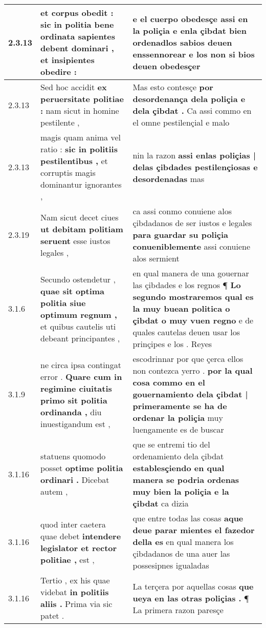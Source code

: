 \begin{tabular}{|p{1cm}|p{6.5cm}|p{6.5cm}|}
2.3.13 & et corpus obedit : \textbf{ sic in politia bene ordinata sapientes debent dominari , } et insipientes obedire : & e el cuerpo obedesçe assi en la poliçia \textbf{ e enla çibdat bien ordenadlos sabios deuen enssennorear } e los non si bios deuen obedesçer \\\hline
2.3.13 & Sed hoc accidit \textbf{ ex peruersitate politiae : } nam sicut in homine pestilente , & Mas esto contesçe \textbf{ por desordenança dela poliçia e dela çibdat . } Ca assi commo en el omne pestilençial e malo \\\hline
2.3.13 & magis quam anima vel ratio : \textbf{ sic in politiis pestilentibus , } et corruptis magis dominantur ignorantes , & nin la razon \textbf{ assi enlas poliçias | delas çibdades pestilençiosas e desordenadas } mas \\\hline
2.3.19 & Nam sicut decet ciues \textbf{ ut debitam politiam seruent } esse iustos legales , & ca assi conmo conuiene alos çibdadanos de ser iustos e legales \textbf{ para guardar su poliçia conueniblemente } assi conuiene alos sermient \\\hline
3.1.6 & Secundo ostendetur , \textbf{ quae sit optima politia siue optimum regnum , } et quibus cautelis uti debeant principantes , & en qual manera de una gouernar las çibdades e los regnos ¶ \textbf{ Lo segundo mostraremos qual es la muy buean politica o çibdat o muy vuen regno } e de quales cautelas deuen usar los prinçipes e los . Reyes \\\hline
3.1.9 & ne circa ipsa contingat error . \textbf{ Quare cum in regimine ciuitatis primo sit politia ordinanda , } diu inuestigandum est , & escodrinnar por que çerca ellos non contezca yerro . \textbf{ por la qual cosa commo en el gouernamiento dela çibdat | primeramente se ha de ordenar la poliçia } muy luengamente es de buscar \\\hline
3.1.16 & statuens quomodo posset \textbf{ optime politia ordinari . } Dicebat autem , & que se entremi tio del ordenamiento dela çibdat \textbf{ establesçiendo en qual manera se podria ordenas muy bien la poliçia e la çibdat } ca dizia \\\hline
3.1.16 & quod inter caetera quae debet \textbf{ intendere legislator et rector politiae , } est , & que entre todas las cosas \textbf{ aque deue parar mientes el fazedor della es } en qual manera los çibdadanos de una auer las possesipnes igualadas \\\hline
3.1.16 & Tertio , ex his quae videbat \textbf{ in politiis aliis . } Prima via sic patet . & La terçera por aquellas cosas \textbf{ que ueya en las otras poliçias . } ¶ La primera razon paresçe \\\hline

\end{tabular}
